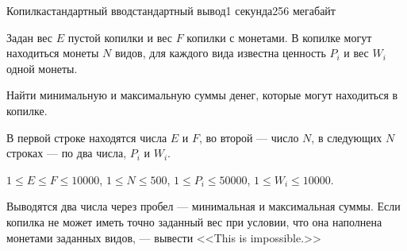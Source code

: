 \begin{problem}{Копилка}{стандартный ввод}{стандартный вывод}{1 секунда}{256 мегабайт}

Задан вес $E$ пустой копилки и вес $F$ копилки с монетами. В копилке
могут находиться монеты $N$ видов, для каждого вида известна ценность
$P_i$ и вес $W_i$ одной монеты.

Найти минимальную и максимальную суммы денег, которые могут находиться
в копилке.


\InputFile
В первой строке находятся числа $E$ и $F$, во второй --- число $N$,
в следующих $N$ строках --- по два числа, $P_i$ и
$W_i$.

$1 \le E \le F \le 10000$,
$1 \le N \le 500$,
$1 \le P_i \le 50000$,
$1 \le W_i \le 10000$.


\OutputFile
Выводятся два числа через пробел --- минимальная и максимальная суммы.
Если копилка не может иметь точно заданный вес при условии,
что она наполнена монетами заданных видов, ---
вывести <<This is impossible.>>


\Examples

\begin{example}
%
%
%
\end{example}

\end{problem}

